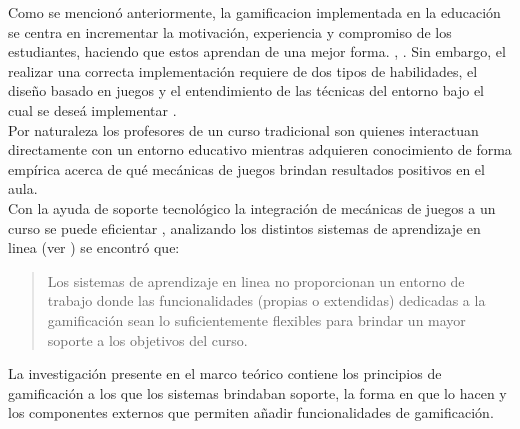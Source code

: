  Como se mencionó anteriormente, la \gls{gamificacion} implementada en la educación se centra
 en incrementar la motivación, experiencia y compromiso de los estudiantes, haciendo que estos
 aprendan de una mejor forma. \cite{GamInE-Learning}, \cite{Lee}.
 \noindent Sin embargo, el realizar una correcta implementación requiere de dos tipos de
 habilidades, el diseño basado en juegos y el entendimiento de las técnicas del entorno
 bajo el cual se deseá implementar \cite[p. 7]{ForTheWin}.\\

 \noindent Por naturaleza los profesores de un curso tradicional son quienes interactuan
 directamente con un entorno educativo mientras adquieren conocimiento de forma empírica
 acerca de qué mecánicas de juegos brindan resultados positivos en el aula.\\

 \noindent Con la ayuda de soporte tecnológico la integración de mecánicas de juegos a un
 curso se puede eficientar \cite{Wood-Reiners}, analizando los distintos sistemas de
 aprendizaje en linea (ver ) se encontró que:

    \begin{quote}
    \colorbox{blue!05}{\parbox{\dimexpr\linewidth-2\fboxsep}{\strut%
        Los sistemas de aprendizaje en linea no proporcionan un entorno
        de trabajo donde las funcionalidades (propias o extendidas) dedicadas
        a la gamificación sean lo suficientemente flexibles para brindar un
        mayor soporte a los objetivos del curso.
    \strut}}%
    \end{quote}

 \hfill \par
 \noindent La investigación presente en el marco teórico contiene los principios de gamificación
 a los que los sistemas brindaban soporte, la forma en que lo hacen y los componentes externos que
 permiten añadir funcionalidades de gamificación.



